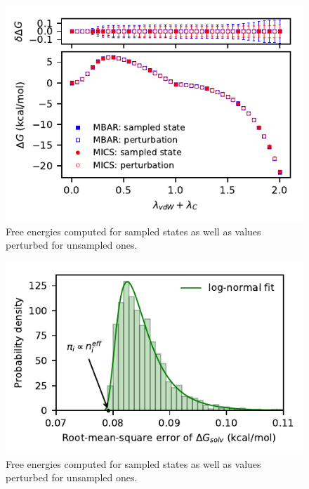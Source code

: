 \documentclass[
    journal=jctcce,
    layout=twocolumn
]{achemso}
\begin{document}

\begin{figure}
	\label{fig:glucose FEP}
	\includegraphics{glucose_fep.pdf}
	\caption{Free energies computed for sampled states as well as values perturbed for unsampled ones.}
\end{figure}


\begin{figure}
	\label{fig:composition analysis}
	\includegraphics{composition_analysis.pdf}
	\caption{Free energies computed for sampled states as well as values perturbed for unsampled ones.}
\end{figure}
\end{document}
